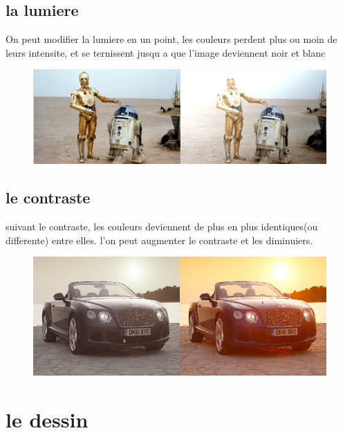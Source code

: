 \documentclass[12pt, a4paper]{report}
\begin{document}
\newpage

\section{la lumiere}

On peut modifier la lumiere en un point, les couleurs perdent plus ou moin de leurs intensite, et se ternissent jusqu a que l'image deviennent noir et blanc

\begin{figure}[!h]
\begin{center} \includegraphics[width=1\textwidth]{images/lumi.png} \end{center}
\end{figure}



\section{le contraste}
suivant le contraste, les couleurs deviennent de plus en plus identiques(ou differente) entre elles.
l'on peut augmenter le contraste et les diminuiers.

\begin{figure}[!h]
\begin{center} \includegraphics[width=1\textwidth]{images/foncer.png} \end{center}
\end{figure}

\newpage



\chapter {le dessin}
\end{document}
